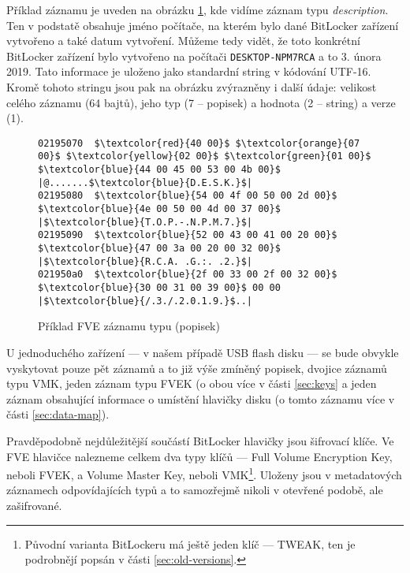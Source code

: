 
Příklad  záznamu je uveden na obrázku \ref{fig:fve-entry-desc}, kde vidíme záznam typu \emph{description}. Ten v podstatě obsahuje jméno počítače, na kterém bylo dané BitLocker zařízení vytvořeno a také datum vytvoření. Můžeme tedy vidět, že toto konkrétní BitLocker zařízení bylo vytvořeno na počítači \texttt{DESKTOP-NPM7RCA} a to 3. února 2019. Tato informace je uloženo jako standardní string v kódování UTF-16. Kromě tohoto stringu jsou pak na obrázku zvýrazněny i další údaje: velikost celého záznamu (64 bajtů), jeho typ (7 -- popisek) a hodnota (2 -- string) a verze (1).


\begin{figure}[h]
		\centering
		\captionsetup{width=0.65\linewidth}
\begin{lstlisting}[frame=none, escapechar=$, basicstyle=\ttfamily\small, columns=fullflexible, keepspaces=true]
02195070  $\textcolor{red}{40 00}$ $\textcolor{orange}{07 00}$ $\textcolor{yellow}{02 00}$ $\textcolor{green}{01 00}$  $\textcolor{blue}{44 00 45 00 53 00 4b 00}$ |@.......$\textcolor{blue}{D.E.S.K.}$|
02195080  $\textcolor{blue}{54 00 4f 00 50 00 2d 00}$  $\textcolor{blue}{4e 00 50 00 4d 00 37 00}$ |$\textcolor{blue}{T.O.P.-.N.P.M.7.}$|
02195090  $\textcolor{blue}{52 00 43 00 41 00 20 00}$  $\textcolor{blue}{47 00 3a 00 20 00 32 00}$ |$\textcolor{blue}{R.C.A. .G.:. .2.}$|
021950a0  $\textcolor{blue}{2f 00 33 00 2f 00 32 00}$  $\textcolor{blue}{30 00 31 00 39 00}$ 00 00 |$\textcolor{blue}{/.3./.2.0.1.9.}$..|
\end{lstlisting}
		\caption{Příklad FVE záznamu typu  (popisek)}
		\label{fig:fve-entry-desc}
\end{figure}

U jednoduchého zařízení --- v našem případě USB flash disku --- se bude obvykle vyskytovat pouze pět záznamů a to již výše zmíněný popisek, dvojice záznamů typu VMK, jeden záznam typu FVEK (o obou více v části \ref{sec:keys} a jeden záznam obsahující informace o umístění hlavičky disku (o tomto záznamu více v části \ref{sec:data-map}).

\label{sec:keys}

Pravděpodobně nejdůležitější součástí BitLocker hlavičky jsou šifrovací klíče. Ve FVE hlavičce nalezneme celkem dva typy klíčů --- Full Volume Encryption Key, neboli FVEK, a Volume Master Key, neboli VMK\footnote{Původní varianta BitLockeru má ještě jeden klíč --- TWEAK, ten je podrobnějí popsán v části \ref{sec:old-versions}.}. Uloženy jsou v metadatových záznamech odpovídajících typů a to samozřejmě nikoli v otevřené podobě, ale zašifrované.

